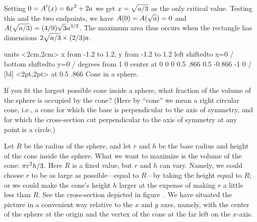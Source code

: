 Setting $\displaystyle 0=A'(x)=6x^2+2a$ we get $\displaystyle x=\sqrt{a/3}$ as the only critical
value. Testing this and the two endpoints, we have
$\displaystyle A(0)=A(\sqrt{a})=0$ and $\displaystyle A(\sqrt{a/3})=(4/9)\sqrt{3}a^{3/2}$. The
maximum area thus occurs when the rectangle has dimensions
$\displaystyle 2\sqrt{a/3}\times (2/3)a$.
\endexample

\figure
\texonly
\vbox{\beginpicture
\normalgraphs
\ninepoint
\setcoordinatesystem units <2cm,2cm>
\setplotarea x from -1.2 to 1.2, y from -1.2 to 1.2
\axis left shiftedto x=0 /
\axis bottom shiftedto y=0 /
\setquadratic
{} degrees from 1 0 center at 0 0
\setlinear
{} 0 0.5 .866 0.5 -0.866 -1 0 /
 [bl] <2pt,2pt> at 0.5 .866
\endpicture}
\endtexonly
{}
\begincaption
Cone in a sphere.
\endcaption
\endfigure

\example
If you fit the largest possible cone inside a sphere, what fraction of the
volume of the sphere is occupied by the cone?  (Here by ``cone'' we mean a
right circular cone, i.e., a cone for which the base is perpendicular to
the axis of symmetry, and for which the cross-section cut perpendicular to
the axis of symmetry at any point is a circle.)


Let $R$ be the radius of the sphere, and let $r$ and $h$ be the base radius
and height of the cone inside the sphere.  What we want to maximize is the
volume of the cone: $\displaystyle \pi r^2h/3$.  Here $R$ is a fixed value, but
$r$ and $h$ can vary.  Namely, we could choose $r$ to be as large as
possible---equal to $R$---by taking the height equal to $R$; or we
could make the cone's height $h$ larger at the expense of making $r$ a
little less than $R$.  See the cross-section depicted in
figure~. We
have situated the picture in a convenient way relative to the $x$ and
$y$ axes, namely, with the center of the sphere at the origin and the
vertex of the cone at the far left on the $x$-axis.

